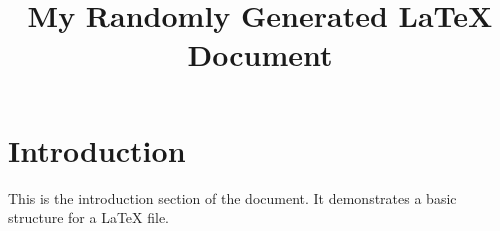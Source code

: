 \documentclass{article}
\title{My Randomly Generated LaTeX Document}
\author{}
\date{}
\begin{document}
\maketitle

\section{Introduction}
This is the introduction section of the document. It demonstrates a basic structure for a LaTeX file.
\end{document}
